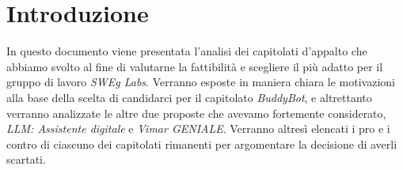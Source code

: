 \section{Introduzione}

In questo documento viene presentata l'analisi dei capitolati d'appalto che abbiamo svolto al fine di valutarne la fattibilità e scegliere il più adatto 
per il gruppo di lavoro \emph{SWEg Labs}. Verranno esposte in maniera chiara le motivazioni alla base della scelta di candidarci per il capitolato 
\emph{BuddyBot}, e altrettanto verranno analizzate le altre due proposte che avevamo fortemente considerato, \emph{LLM: Assistente digitale} e 
\emph{Vimar GENIALE}. Verranno altresì elencati i pro e i contro di ciascuno dei capitolati rimanenti per argomentare la decisione di averli scartati.